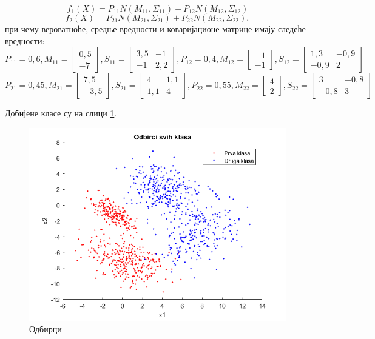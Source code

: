 $$f_1(X) = P_{11} N(M_{11}, \Sigma_{11}) + P_{12} N(M_{12}, \Sigma_{12})$$
$$f_2(X) = P_{21} N(M_{21}, \Sigma_{21}) + P_{22} N(M_{22}, \Sigma_{22}),$$
при чему вероватноће, средње вредности и коваријационе матрице имају следеће вредности:
$$P_{11} = 0,6,  M_{11} = \begin{bmatrix}
   0,5\\
   -7
\end{bmatrix}, 
S_{11} = \begin{bmatrix}
				   3,5 & -1\\
				   -1 & 2,2
				\end{bmatrix},
P_{12} = 0,4,  M_{12} = \begin{bmatrix}
										   -1\\
										   -1
										\end{bmatrix}, 
S_{12} = \begin{bmatrix}
				   1,3 & -0,9\\
			   	-0,9 &  2
				\end{bmatrix}
$$				
$$P_{21} = 0,45,  M_{21} = \begin{bmatrix}
   7,5\\
   -3,5
\end{bmatrix}, 
S_{21} = \begin{bmatrix}
				   4 & 1,1\\
				   1,1 & 4
				\end{bmatrix},
P_{22} = 0,55,  M_{22} = \begin{bmatrix}
										   4\\
										   2
										\end{bmatrix}, 
S_{22} = \begin{bmatrix}
				   3 & -0,8\\
			   	-0,8 &  3
				\end{bmatrix}
$$

Добијене класе су на слици \ref{fig:linClass}.
\begin{figure}[htb!]
\centering
\includegraphics[scale=.5]{pictures/3/LinClass}
\caption{Одбирци}\label{fig:linClass}
\end{figure}
